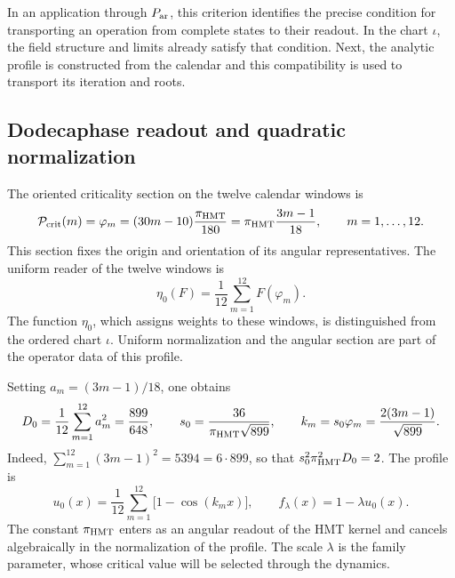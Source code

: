 In an application through \(P_{\rm ar}\), this criterion identifies the precise condition for transporting an operation from complete states to their readout. In the chart \(\iota\), the field structure and limits already satisfy that condition. Next, the analytic profile is constructed from the calendar and this compatibility is used to transport its iteration and roots.

\subsection{Dodecaphase readout and quadratic normalization}
\label{hmtfg:perfil-dodecafasico}

The oriented criticality section on the twelve calendar windows is
\[
 \mathcal P_{\rm crit}(m)=\varphi_m
   =(30m-10)\frac{\pi_{\rm HMT}}{180}
   =\pi_{\rm HMT}\frac{3m-1}{18},\qquad m=1,\ldots,12.
\]
This section fixes the origin and orientation of its angular representatives. The uniform reader of the twelve windows is
\[
 \eta_0(F)=\frac1{12}\sum_{m=1}^{12}F(\varphi_m).
\]
The function \(\eta_0\), which assigns weights to these windows, is distinguished from the ordered chart \(\iota\). Uniform normalization and the angular section are part of the operator data of this profile.

Setting \(a_m=(3m-1)/18\), one obtains
\[
 D_0=\frac1{12}\sum_{m=1}^{12}a_m^2=\frac{899}{648},
 \qquad
 s_0=\frac{36}{\pi_{\rm HMT}\sqrt{899}},\qquad
 k_m=s_0\varphi_m=\frac{2(3m-1)}{\sqrt{899}}.
\]
Indeed, \(\sum_{m=1}^{12}(3m-1)^2=5394=6\cdot899\), so that \(s_0^2\pi_{\rm HMT}^2D_0=2\). The profile is
\begin{equation}
 u_0(x)=\frac1{12}\sum_{m=1}^{12}\bigl[1-\cos(k_mx)\bigr],
 \qquad f_\lambda(x)=1-\lambda u_0(x).
 \label{hmtfg:perfil-familia}
\end{equation}
The constant \(\pi_{\rm HMT}\) enters as an angular readout of the HMT kernel and cancels algebraically in the normalization of the profile. The scale \(\lambda\) is the family parameter, whose critical value will be selected through the dynamics.

